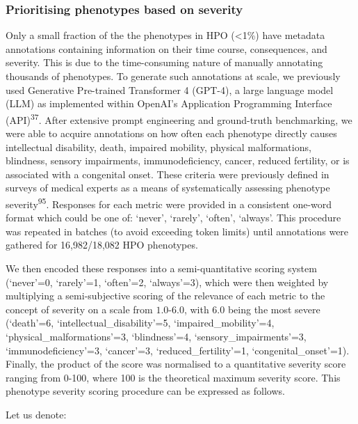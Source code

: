 \documentclass[
]{article}
\begin{document}
\subsubsection{Prioritising phenotypes based on
severity}\label{prioritising-phenotypes-based-on-severity-1}

Only a small fraction of the the phenotypes in HPO (\textless1\%) have
metadata annotations containing information on their time course,
consequences, and severity. This is due to the time-consuming nature of
manually annotating thousands of phenotypes. To generate such
annotations at scale, we previously used Generative Pre-trained
Transformer 4 (GPT-4), a large language model (LLM) as implemented
within OpenAI's Application Programming Interface
(API)\textsuperscript{37}. After extensive prompt engineering and
ground-truth benchmarking, we were able to acquire annotations on how
often each phenotype directly causes intellectual disability, death,
impaired mobility, physical malformations, blindness, sensory
impairments, immunodeficiency, cancer, reduced fertility, or is
associated with a congenital onset. These criteria were previously
defined in surveys of medical experts as a means of systematically
assessing phenotype severity\textsuperscript{95}. Responses for each
metric were provided in a consistent one-word format which could be one
of: `never', `rarely', `often', `always'. This procedure was repeated in
batches (to avoid exceeding token limits) until annotations were
gathered for 16,982/18,082 HPO phenotypes.

We then encoded these responses into a semi-quantitative scoring system
(`never'=0, `rarely'=1, `often'=2, `always'=3), which were then weighted
by multiplying a semi-subjective scoring of the relevance of each metric
to the concept of severity on a scale from \(1.0\)-\(6.0\), with \(6.0\)
being the most severe (`death'=6, `intellectual\_disability'=5,
`impaired\_mobility'=4, `physical\_malformations'=3, `blindness'=4,
`sensory\_impairments'=3, `immunodeficiency'=3, `cancer'=3,
`reduced\_fertility'=1, `congenital\_onset'=1). Finally, the product of
the score was normalised to a quantitative severity score ranging from
0-100, where 100 is the theoretical maximum severity score. This
phenotype severity scoring procedure can be expressed as follows.

Let us denote:
\end{document}
